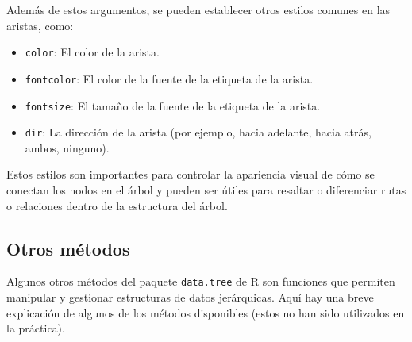 \documentclass[12pt]{report}\usepackage[]{graphicx}\usepackage[dvipsnames]{xcolor}
\begin{document}
			 	\noindent Además de estos argumentos, se pueden establecer otros estilos comunes en las aristas, como:
			 	
			 	\begin{itemize}
			 		\item \texttt{color}: El color de la arista.
			 		\item \texttt{fontcolor}: El color de la fuente de la etiqueta de la arista.
			 		\item \texttt{fontsize}: El tamaño de la fuente de la etiqueta de la arista.
			 		\item \texttt{dir}: La dirección de la arista (por ejemplo, hacia adelante, hacia atrás, ambos, ninguno).
			 	\end{itemize}
			 	
			 	Estos estilos son importantes para controlar la apariencia visual de cómo se conectan los nodos en el árbol y pueden ser útiles para resaltar o diferenciar rutas o relaciones dentro de la estructura del árbol.
			 	
		 	\subsection{Otros métodos}
			 	
			 	Algunos otros métodos del paquete \texttt{data.tree} de R son funciones que permiten manipular y gestionar estructuras de datos jerárquicas. Aquí hay una breve explicación de algunos de los métodos disponibles (estos no han sido utilizados en la práctica).
			 	
\end{document}
